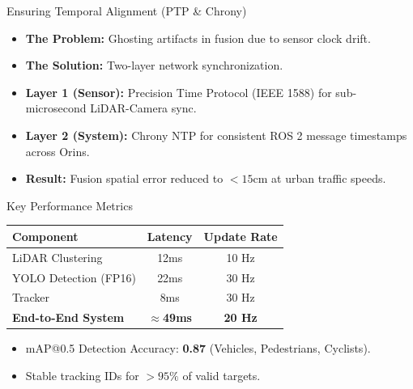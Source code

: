 \documentclass[pdf, 10pt]{beamer}
\begin{document}
\begin{frame}{Ensuring Temporal Alignment (PTP & Chrony)}
    \begin{itemize}
        \item \textbf{The Problem:} Ghosting artifacts in fusion due to sensor clock drift.
        \item \textbf{The Solution:} Two-layer network synchronization.
        \item \textbf{Layer 1 (Sensor):} Precision Time Protocol (IEEE 1588) for sub-microsecond LiDAR-Camera sync.
        \item \textbf{Layer 2 (System):} Chrony NTP for consistent ROS 2 message timestamps across Orins.
        \item \textbf{Result:} Fusion spatial error reduced to $<15$cm at urban traffic speeds.
    \end{itemize}
\end{frame}

\begin{frame}{Key Performance Metrics}
    \begin{table}
        \centering
        \begin{tabular}{l c c}
            \toprule
            \textbf{Component} & \textbf{Latency} & \textbf{Update Rate} \\
            \midrule
            LiDAR Clustering & 12ms & 10 Hz \\
            YOLO Detection (FP16) & 22ms & 30 Hz \\
            Tracker & 8ms & 30 Hz \\
            \midrule
            \textbf{End-to-End System} & \textbf{$\approx$49ms} & \textbf{20 Hz} \\
            \bottomrule
        \end{tabular}
    \end{table}
    \begin{itemize}
        \item mAP@0.5 Detection Accuracy: \textbf{0.87} (Vehicles, Pedestrians, Cyclists).
        \item Stable tracking IDs for $>95\%$ of valid targets.
    \end{itemize}
\end{frame}
\end{document}
